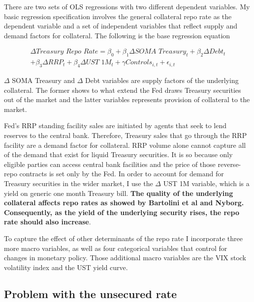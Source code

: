 \documentclass[11pt,a4paper,english,oneside]{article}
\begin{document}
There are two sets of OLS regressions with two different dependent variables. My basic regression specification involves the general collateral repo rate as the dependent variable and a set of independent variables that reflect supply and demand factors for collateral. The following is the base regression equation

\begin{equation} \label{eq:1}
  \begin{gathered}
  \Delta \textit{Treasury Repo Rate} = \beta_0 + \beta_1 \Delta \textit{SOMA Treasury}_t + \beta_2 \Delta \textit{Debt}_t \\ + \beta_3 \Delta \textit{RRP}_t  + \beta_4 \Delta \textit{UST 1M}_t + \gamma \textit{Controls}_{i,t} + \epsilon_{i,t}
  \end{gathered}
\end{equation}

$\Delta$ SOMA Treasury and $\Delta$ Debt variables are supply factors of the underlying collateral. The former shows to what extend the Fed draws Treasury securities out of the market and the latter variables represents provision of collateral to the market.

Fed's RRP standing facility sales are initiated by agents that seek to lend reserves to the central bank. Therefore, Treasury sales that go through the RRP facility are a demand factor for collateral. RRP volume alone cannot capture all of the demand that exist for liquid Treasury securities. It is so because only eligible parties can access central bank facilities and the price of those reverse-repo contracts is set only by the Fed. In order to account for demand for Treasury securities in the wider market, I use the $\Delta$ UST 1M variable, which is a yield on generic one month Treasury bill. \textbf{The quality of the underlying collateral affects repo rates as showed by Bartolini et al and Nyborg. Consequently, as the yield of the underlying security rises, the repo rate should also increase}.

To capture the effect of other determinants of the repo rate I incorporate three more macro variables, as well as four categorical variables that control for changes in monetary policy. Those additional macro variables are the VIX stock volatility index and the UST yield curve.

\subsection{Problem with the unsecured rate}
\end{document}
